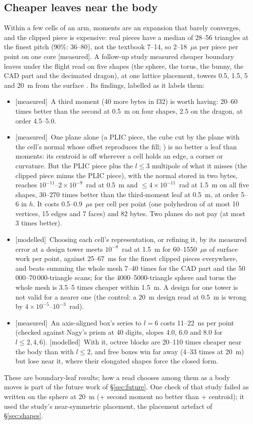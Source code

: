 \documentclass[10pt,a4paper]{article}
\newcommand{\tagM}{\textsf{\small[measured]}}
\newcommand{\tagMo}{\textsf{\small[modelled]}}
\begin{document}
\subsection{Cheaper leaves near the body}\label{sec:cheaper}

Within a few cells of an arm, moments are an expansion that barely converges, and the clipped piece
is expensive: real pieces have a median of 28--56 triangles at the finest pitch (90\%: 36--80), not
the textbook 7--14, so 2--18~$\mu$s per piece per point on one core \tagM. A follow-up study measured
cheaper boundary leaves under the flight read on five shapes (the sphere, the torus, the bunny, the
CAD part and the decimated dragon), at one lattice placement, towers 0.5, 1.5, 5 and 20~m from the
surface \citep{papersurface}. Its findings, labelled as it labels them:
\begin{itemize}\itemsep0pt
\item \tagM\ A third moment (40 more bytes in f32) is worth having: 20--60 times better than the
second at 0.5~m on four shapes, 2.5 on the dragon, at order 4.5--5.0.
\item \tagM\ One plane alone (a PLIC piece, the cube cut by the plane with the cell's normal whose
offset reproduces the fill; \citealp{weymouth2010}) is no better a leaf than moments: its centroid is
off wherever a cell holds an edge, a corner or curvature. But the PLIC piece plus the $l\le3$
multipole of what it misses (the clipped piece minus the PLIC piece), with the normal stored in two
bytes, reaches $10^{-11}$--$2\times10^{-9}$~rad at 0.5~m and $\le4\times10^{-11}$~rad at 1.5~m on all
five shapes, 30--270 times better than the third-moment leaf at 0.5~m, at order 5--6 in $h$. It costs
0.5--0.9~$\mu$s per cell per point (one polyhedron of at most 10 vertices, 15 edges and 7 faces) and
82 bytes. Two planes do not pay (at most 3 times better).
\item \tagMo\ Choosing each cell's representation, or refining it, by its measured error at a design
tower meets $10^{-8}$~rad at 1.5~m for 60--1550~$\mu$s of surface work per point, against
25--67~ms for the finest clipped pieces everywhere, and beats summing the whole mesh 7--40 times for
the CAD part and the 50\,000--70\,000-triangle scans; for the 4000--5000-triangle sphere and torus the
whole mesh is 3.5--5 times cheaper within 1.5~m. A design for one tower is not valid for a nearer
one (the control: a 20~m design read at 0.5~m is wrong by $4\times10^{-5}$--$10^{-3}$~rad).
\item \tagM\ An axis-aligned box's series to $l=6$ costs 11--22~ns per point (checked against
Nagy's prism at 40 digits, slopes 4.0, 6.0 and 8.0 for $l\le2,4,6$). \tagMo\ With it, octree blocks are 20--110
times cheaper near the body than with $l\le2$, and free boxes win far away (4--33 times at 20~m) but
lose near it, where their elongated shapes force the closed form.
\end{itemize}
These are boundary-leaf results; how a read chooses among them as a body moves is part of the future
work of \S\ref{sec:future}. One check of that study failed as written on the sphere at 20~m (+ second
moment no better than + centroid); it used the study's near-symmetric placement, the placement artefact of \S\ref{sec:shapes}.
\end{document}
